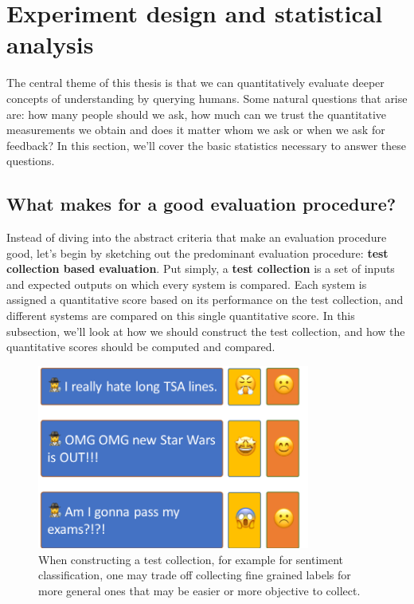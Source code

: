 \section{\label{sec:setup:statistical} Experiment design and statistical analysis}

The central theme of this thesis is that we can quantitatively evaluate deeper concepts of understanding by querying humans.
Some natural questions that arise are: how many people should we ask, how much can we trust the quantitative measurements we obtain and does it matter whom we ask or when we ask for feedback?
In this section, we'll cover the basic statistics necessary to answer these questions.

\subsection{What makes for a good evaluation procedure?}

Instead of diving into the abstract criteria that make an evaluation procedure good, let's begin by sketching out the predominant evaluation procedure: \textbf{test collection based evaluation}.
Put simply, a \textbf{test collection} is a set of inputs and expected outputs on which every system is compared.
Each system is assigned a quantitative score based on its performance on the test collection, and different systems are compared on this single quantitative score.
In this subsection, we'll look at how we should construct the test collection, and how the quantitative scores should be computed and compared.

\begin{figure}
  \centering
  \includegraphics[width=0.8\textwidth]{figures/sentiment-choices}
  \caption[Constructing test collections]{\label{setup:sentiment-choices}  When constructing a test collection, for example for sentiment classification, one may trade off collecting fine grained labels for more general ones that may be easier or more objective to collect. }
\end{figure}

